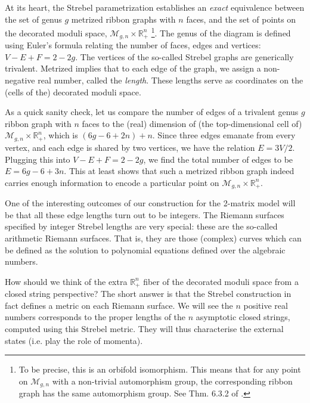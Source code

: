 \documentclass[english]{article}
\renewcommand{\>}{\rangle}
\newcommand{\<}{\langle}
\renewcommand{\(}{\left(}
\renewcommand{\)}{\right)}
\begin{document}
At its heart, the Strebel parametrization establishes an \textit{exact} equivalence between the set of genus $g$ metrized ribbon graphs with $n$ faces, and the set of points on the decorated moduli space,  $\mathcal{M}_{g,n} \times \mathbb{R}_{+}^{n}$ \footnote{To be precise, this is an orbifold isomorphism. This means that for any point on $\mathcal{M}_{g,n}$ with a non-trivial automorphism group, the corresponding ribbon graph has the same automorphism group. See Thm. 6.3.2 of \cite{CountingSurfaces}.}. The genus of the diagram is defined using Euler's formula relating the number of faces, edges and vertices: $V-E+F=2-2g$. The vertices of the so-called Strebel graphs are generically trivalent. Metrized implies that to each edge of the graph, we assign a non-negative real number, called the {\it length}. These lengths serve as coordinates on the (cells of the) decorated moduli space. 

As a quick sanity check, let us compare the number of edges of a trivalent genus $g$ ribbon graph with $n$ faces to the (real) dimension of (the top-dimensional cell of) $\mathcal{M}_{g,n} \times \mathbb{R}_{+}^{n}$, which is $(6g-6+2n)+n$. Since three edges emanate from every vertex, and each edge is shared by two vertices, we have the relation $E=3V/2$. Plugging this into $V-E+F=2-2g$, we find the total number of edges to be $E=6g-6+3n$. This at least shows that such a metrized ribbon graph indeed carries enough information to encode a particular point on  $\mathcal{M}_{g,n} \times \mathbb{R}_{+}^{n}$.

One of the interesting outcomes of our construction for the 2-matrix model will be that all these edge lengths turn out to be integers. The Riemann surfaces specified by integer Strebel lengths are very special: these are the so-called arithmetic Riemann surfaces. That is, they are those (complex) curves which can be defined as the solution to polynomial equations defined over the algebraic numbers. 

How should we think of the extra $\mathbb{R}_{+}^{n}$ fiber of the decorated moduli space from a closed string perspective? The short answer is that the Strebel construction in fact defines a metric on each Riemann surface. We will see the $n$ positive real numbers corresponds to the proper lengths of the $n$ asymptotic closed strings, computed using this Strebel metric. They will thus characterise the external states (i.e. play the role of momenta). 
\end{document}
